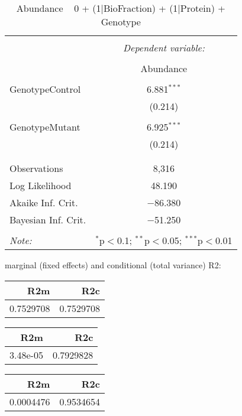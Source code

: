 \documentclass[11pt]{report}
\begin{document}
\begin{table}[!htbp] \centering 
  \caption{Abundance ~ 0 + (1|BioFraction) + (1|Protein) + Genotype} 
  \label{} 
\begin{tabular}{@{\extracolsep{5pt}}lc} 
\\[-1.8ex]\hline 
\hline \\[-1.8ex] 
 & \multicolumn{1}{c}{\textit{Dependent variable:}} \\ 
\cline{2-2} 
\\[-1.8ex] & Abundance \\ 
\hline \\[-1.8ex] 
 GenotypeControl & 6.881$^{***}$ \\ 
  & (0.214) \\ 
  & \\ 
 GenotypeMutant & 6.925$^{***}$ \\ 
  & (0.214) \\ 
  & \\ 
\hline \\[-1.8ex] 
Observations & 8,316 \\ 
Log Likelihood & 48.190 \\ 
Akaike Inf. Crit. & $-$86.380 \\ 
Bayesian Inf. Crit. & $-$51.250 \\ 
\hline 
\hline \\[-1.8ex] 
\textit{Note:}  & \multicolumn{1}{r}{$^{*}$p$<$0.1; $^{**}$p$<$0.05; $^{***}$p$<$0.01} \\ 
\end{tabular} 
\end{table} 
marginal (fixed effects) and conditional (total variance) R2:

\begin{tabular}{r|r}
\hline
R2m & R2c\\
\hline
0.7529708 & 0.7529708\\
\hline
\end{tabular}

\begin{tabular}{r|r}
\hline
R2m & R2c\\
\hline
3.48e-05 & 0.7929828\\
\hline
\end{tabular}

\begin{tabular}{r|r}
\hline
R2m & R2c\\
\hline
0.0004476 & 0.9534654\\
\hline
\end{tabular}
\end{document}
